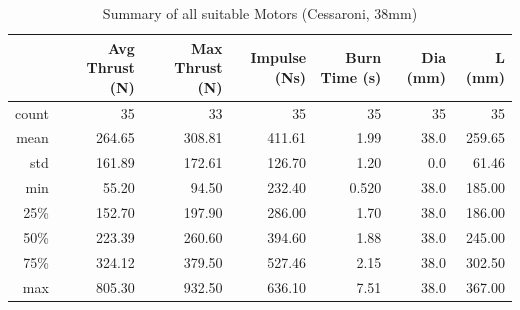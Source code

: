 \documentclass[11pt]{article}
\begin{document}
\begin{table}[tbhp]
   \centering
   \caption{Summary of all suitable Motors (Cessaroni, 38mm)}
\begin{tabular}{@{}rrrrrrr@{}}
\toprule
& Avg Thrust (N) & Max Thrust (N) & Impulse (Ns) & Burn Time (s) & Dia (mm)   & L (mm)     \\ \midrule
count        & 35    & 33      & 35   & 35 & 35   & 35  \\
mean         & 264.65   & 308.81     & 411.61  & 1.99  & 38.0  & 259.65\\
std          & 161.89   & 172.61     & 126.70  & 1.20  & 0.0    & 61.46  \\
min          & 55.20    & 94.50      & 232.40  & 0.520  & 38.0   & 185.00 \\
25\%         & 152.70   & 197.90     & 286.00  & 1.70  & 38.0   & 186.00 \\
50\%         & 223.39   & 260.60     & 394.60  & 1.88  & 38.0   & 245.00 \\
75\%         & 324.12   & 379.50     & 527.46  & 2.15  & 38.0   & 302.50 \\
max          & 805.30   & 932.50     & 636.10  & 7.51  & 38.0   & 367.00\\ \bottomrule
\end{tabular}
   \label{tbl:suitable_motors}
\end{table}
\end{document}
